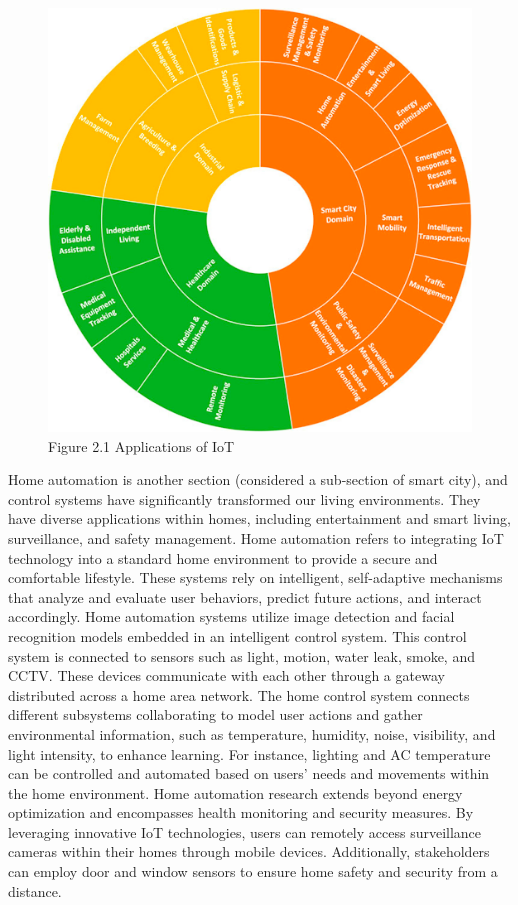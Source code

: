 \begin{center}
    \begin{figure}[!htp]
        \centering
        \includegraphics[width=0.8 \textwidth]{image/application_iot.png}
        \caption{Figure 2.1 Applications of IoT}
        \label{subsection}
    \end{figure}
    \end{center}

Home automation is another section (considered a sub-section of smart city), and control systems have significantly transformed our living environments. They have diverse applications within homes, including entertainment and smart living, surveillance, and safety management. Home automation refers to integrating IoT technology into a standard home environment to provide a secure and comfortable lifestyle. These systems rely on intelligent, self-adaptive mechanisms that analyze and evaluate user behaviors, predict future actions, and interact accordingly.  Home automation systems utilize image detection and facial recognition models embedded in an intelligent control system.
This control system is connected to sensors such as light, motion, water leak, smoke, and CCTV. These devices communicate with each other through a gateway distributed across a home area network. The home control system connects different subsystems collaborating to model user actions and gather environmental information, such as temperature, humidity, noise, visibility, and light intensity, to enhance learning.  For instance, lighting and AC temperature can be controlled and automated based on users' needs and movements within the home environment. Home automation research extends beyond energy optimization and encompasses health monitoring and security measures. 
By leveraging innovative IoT technologies, users can remotely access surveillance cameras within their homes through mobile devices. Additionally, stakeholders can employ door and window sensors to ensure home safety and security from a distance.

